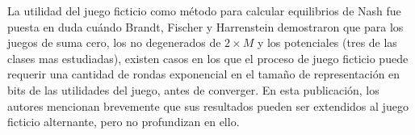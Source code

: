 La utilidad del juego ficticio como método para calcular equilibrios de Nash fue puesta en duda cuándo Brandt, Fischer y Harrenstein \cite{brandt:rate:convergence} demostraron que para los juegos de suma cero, los no degenerados de $2 \times M$ y los potenciales (tres de las clases mas estudiadas), existen casos en los que el proceso de juego ficticio puede requerir una cantidad de rondas exponencial en el tamaño de representación en bits de las utilidades del juego, antes de converger. En esta publicación, los autores mencionan brevemente que sus resultados pueden ser extendidos al juego ficticio alternante, pero no profundizan en ello.